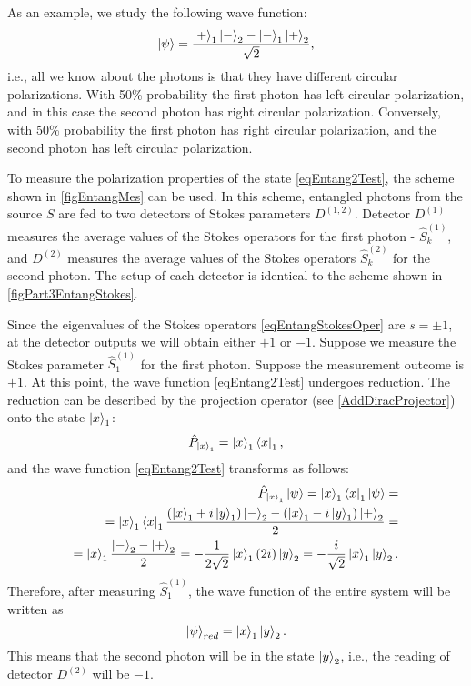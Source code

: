 As an example, we study the following wave function:
\begin{equation}
  \ket{\psi} = \frac{
    \ket{ + }_1\ket{ - }_2 -
    \ket{ - }_1\ket{ + }_2
  }{\sqrt{2}},
\label{eqEntang2Test}
\end{equation}
i.e., all we know about the photons is that they have different
circular polarizations. With 50\% probability the first photon has left
circular polarization, and in this case the second photon has right
circular polarization. Conversely, with 50\% probability the first photon
has right circular polarization, and the second photon has
left circular polarization. 



To measure the polarization properties of the state \eqref{eqEntang2Test},
the scheme shown in \autoref{figEntangMes} can be used. 
In this scheme, entangled photons from the source $S$ are fed to two detectors
of Stokes parameters $D^{(1,2)}$. Detector $D^{(1)}$ measures the average
values of the Stokes operators for the first photon - $\hat{S}_k^{(1)}$, and
$D^{(2)}$ measures the average values of the Stokes operators
$\hat{S}_k^{(2)}$ for the second photon. The setup of each detector
is identical to the scheme shown in \autoref{figPart3EntangStokes}.

Since the eigenvalues of the Stokes operators
\eqref{eqEntangStokesOper} are $s = \pm 1$, at the detector outputs we
will obtain either $+1$ or $-1$. Suppose we measure the Stokes parameter
$\hat{S}_1^{(1)}$ for the first photon. Suppose the measurement outcome is $+1$. At this point, the wave function
\eqref{eqEntang2Test} undergoes reduction. The reduction can be described by the projection operator (see \autoref{AddDiracProjector}) onto the state
$\ket{x}_1$:
\[
\hat{P}_{\ket{x}_1} = \ket{x}_1\bra{x}_1,
\]
and the wave function
\eqref{eqEntang2Test} transforms as follows:
\begin{eqnarray}
  \hat{P}_{\ket{x}_1}\left|\psi\right> =
  \ket{x}_1\bra{x}_1 \left|\psi\right> =
  \nonumber \\
    =
  \ket{x}_1\bra{x}_1
  \frac{
    \left( \ket{x}_1 + i \ket{y}_1 \right)\ket{ - }_2 -
    \left( \ket{x}_1 - i \ket{y}_1 \right)\ket{ + }_2
  }{2} =
  \nonumber \\
  =
  \ket{x}_1
  \frac{\ket{ - }_2 - \ket{ + }_2}{2} = -
  \frac{1}{2\sqrt{2}}\ket{x}_1 \left(2 i\right)
  \ket{y}_2 = -
  \frac{i}{\sqrt{2}}\ket{x}_1\ket{y}_2.
\nonumber
\end{eqnarray}
Therefore, after measuring $\hat{S}_1^{(1)}$, the wave function of the entire
system will be written as
\[
\left|\psi\right>_{red} = \ket{x}_1\ket{y}_2.
\]
This means that the second photon will be in the state $\ket{y}_2$,
i.e., the reading of detector $D^{(2)}$ will be $-1$.

